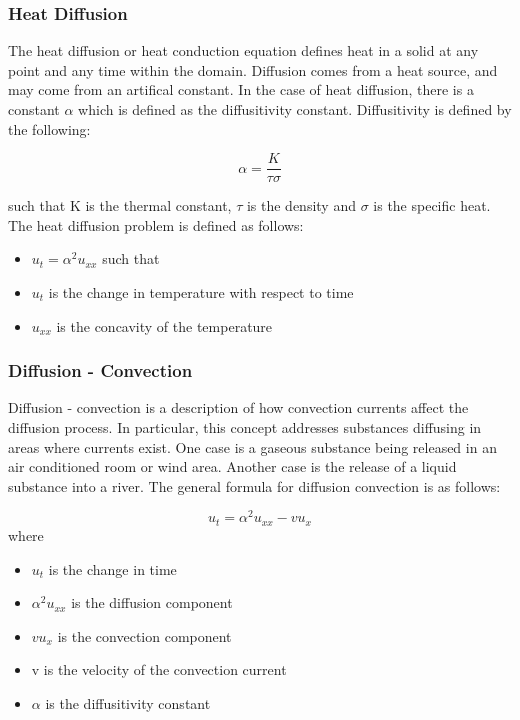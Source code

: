 \subsubsection {Heat Diffusion}

The heat diffusion or heat conduction equation defines heat in a solid at any point and any time within the domain.  Diffusion comes from a heat source, and may come from an artifical constant.  In the case of heat diffusion, there is a constant $\alpha$ which is defined as the diffusitivity constant.  Diffusitivity is defined by the following:

\[\alpha = \frac{K}{\tau \sigma} \]

such that K is the thermal constant, $\tau$ is the density and $\sigma$ is the specific heat.  The heat diffusion problem is defined as follows:


\begin{itemize}
\item $u_t = \alpha ^2 u_{xx} $ such that
\item $u_t$ is the change in temperature with respect to time
\item $u_{xx}$ is the concavity of the temperature
\end{itemize}

\subsubsection {Diffusion - Convection }
Diffusion - convection is a description of how %
convection currents affect the diffusion process.  In particular, this concept addresses substances diffusing in areas where currents exist.  One case is a gaseous substance being released in an air conditioned room or wind area.  Another case is the release of a liquid substance into a river.  The general formula for diffusion convection is as follows:


\[ u_t = \alpha ^2 u_{xx} - vu_x \]  
where 
\begin{itemize}
\item %
$u_t $ is the change in time
\item $\alpha ^2 u_{xx} $ is the diffusion component
\item $vu_x$ is the convection component
\item v is the velocity of the convection current
\item $\alpha$ is the diffusitivity constant
\end{itemize}

